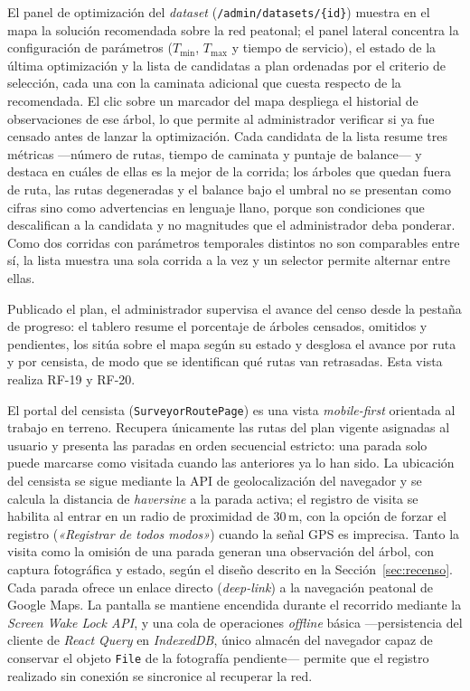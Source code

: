 El panel de optimización del \textit{dataset} (\texttt{/admin/datasets/\{id\}}) muestra en el mapa
la solución recomendada sobre la red peatonal; el panel lateral concentra la configuración de
parámetros ($T_{\min}$, $T_{\max}$ y tiempo de servicio), el estado de la última optimización y la
lista de candidatas a plan ordenadas por el criterio de selección, cada una con la caminata
adicional que cuesta respecto de la recomendada. El clic sobre un marcador del mapa despliega el
historial de observaciones de ese árbol, lo que permite al administrador verificar si ya fue censado
antes de lanzar la optimización. Cada candidata de la lista resume tres métricas ---número de
rutas, tiempo de caminata y puntaje de balance--- y destaca en cuáles de ellas es la mejor de la
corrida; los árboles que quedan fuera de ruta, las rutas degeneradas y el balance bajo el umbral no
se presentan como cifras sino como advertencias en lenguaje llano, porque son condiciones que
descalifican a la candidata y no magnitudes que el administrador deba ponderar. Como dos corridas
con parámetros temporales distintos no son comparables entre sí, la lista muestra una sola corrida
a la vez y un selector permite alternar entre ellas.

Publicado el plan, el administrador supervisa el avance del censo desde la pestaña de progreso: el
tablero resume el porcentaje de árboles censados, omitidos y pendientes, los sitúa sobre el mapa
según su estado y desglosa el avance por ruta y por censista, de modo que se identifican qué rutas
van retrasadas. Esta vista realiza RF-19 y RF-20.

El portal del censista (\texttt{SurveyorRoutePage}) es una vista \textit{mobile-first} orientada al
trabajo en terreno. Recupera únicamente las rutas del plan vigente asignadas al usuario y presenta
las paradas en orden secuencial estricto: una parada solo puede marcarse como visitada cuando las
anteriores ya lo han sido. La ubicación del censista se sigue mediante la API de geolocalización del
navegador y se calcula la distancia de \textit{haversine} \citep{sinnott1984virtues} a la parada
activa; el registro de visita se habilita al entrar en un radio de proximidad de 30\,m, con la
opción de forzar el registro (\textit{«Registrar de todos modos»}) cuando la señal GPS es imprecisa.
Tanto la visita como la omisión de una parada generan una observación del árbol, con captura
fotográfica y estado, según el diseño descrito en la Sección~\ref{sec:recenso}. Cada parada ofrece
un enlace directo (\textit{deep-link}) a la navegación peatonal de Google Maps. La pantalla se
mantiene encendida durante el recorrido mediante la \textit{Screen Wake Lock API}, y una cola de
operaciones \textit{offline} básica ---persistencia del cliente de \textit{React Query} en
\textit{IndexedDB}, único almacén del navegador capaz de conservar el objeto \texttt{File} de la
fotografía pendiente--- permite que el registro realizado sin conexión se sincronice al recuperar
la red.

